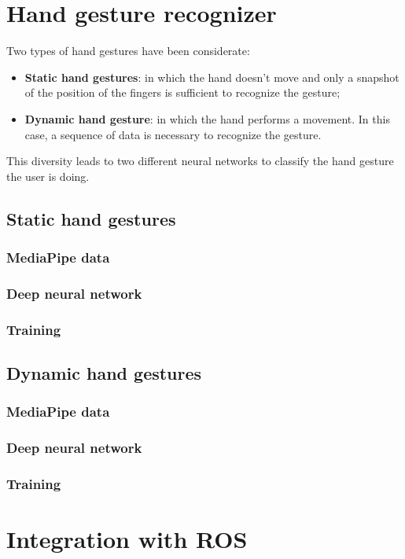\documentclass[../thesis.tex]{subfiles}
\begin{document}
\section{Hand gesture recognizer}
Two types of hand gestures have been considerate:
\begin{itemize}
    \item \textbf{Static hand gestures}: in which the hand doesn't move and only a snapshot of the position of the fingers is sufficient to recognize the gesture;
    \item \textbf{Dynamic hand gesture}: in which the hand performs a movement. In this case, a sequence of data is necessary to recognize the gesture. 
\end{itemize}
This diversity leads to two different neural networks to classify the hand gesture the user is doing.

\subsection{Static hand gestures}

\subsubsection{MediaPipe data}

\subsubsection{Deep neural network}

\subsubsection{Training}

\subsection{Dynamic hand gestures}

\subsubsection{MediaPipe data}

\subsubsection{Deep neural network}

\subsubsection{Training}

\section{Integration with ROS}
\end{document}
